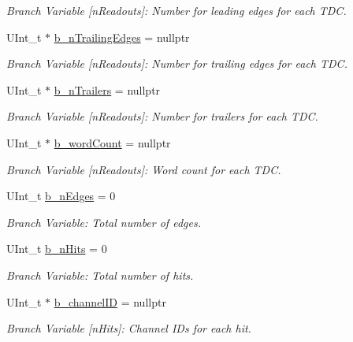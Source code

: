 \begin{DoxyCompactItemize}
\begin{DoxyCompactList}\small\item\em Branch Variable \mbox{[}n\+Readouts\mbox{]}\+: Number for leading edges for each T\+DC. \end{DoxyCompactList}\item 
U\+Int\+\_\+t $\ast$ \hyperlink{class_event_tree_manager_aabb6a03aaab8095cb3e5e04d8389194a}{b\+\_\+n\+Trailing\+Edges} = nullptr
\begin{DoxyCompactList}\small\item\em Branch Variable \mbox{[}n\+Readouts\mbox{]}\+: Number for trailing edges for each T\+DC. \end{DoxyCompactList}\item 
U\+Int\+\_\+t $\ast$ \hyperlink{class_event_tree_manager_ae3d13f63577de75ec8a673ddb8686629}{b\+\_\+n\+Trailers} = nullptr
\begin{DoxyCompactList}\small\item\em Branch Variable \mbox{[}n\+Readouts\mbox{]}\+: Number for trailers for each T\+DC. \end{DoxyCompactList}\item 
U\+Int\+\_\+t $\ast$ \hyperlink{class_event_tree_manager_a7151f5beadcec7080e1b95f12e52a40a}{b\+\_\+word\+Count} = nullptr
\begin{DoxyCompactList}\small\item\em Branch Variable \mbox{[}n\+Readouts\mbox{]}\+: Word count for each T\+DC. \end{DoxyCompactList}\item 
U\+Int\+\_\+t \hyperlink{class_event_tree_manager_a050eedbaf401226c641f54b533cf8d01}{b\+\_\+n\+Edges} = 0
\begin{DoxyCompactList}\small\item\em Branch Variable\+: Total number of edges. \end{DoxyCompactList}\item 
U\+Int\+\_\+t \hyperlink{class_event_tree_manager_a7b7301d89e353ca96b42bcfb360c325e}{b\+\_\+n\+Hits} = 0
\begin{DoxyCompactList}\small\item\em Branch Variable\+: Total number of hits. \end{DoxyCompactList}\item 
U\+Int\+\_\+t $\ast$ \hyperlink{class_event_tree_manager_a663158889f41e6c32537aa698292e4ec}{b\+\_\+channel\+ID} = nullptr
\begin{DoxyCompactList}\small\item\em Branch Variable \mbox{[}n\+Hits\mbox{]}\+: Channel I\+Ds for each hit. \end{DoxyCompactList}\item 

\end{DoxyCompactItemize}
